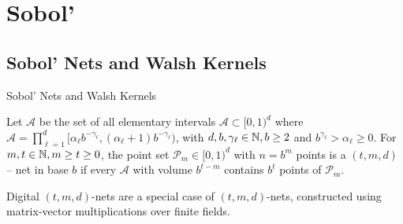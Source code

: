 \documentclass[handout, 10pt,compress,xcolor={usenames,dvipsnames}]{beamer} %
\begin{document}
\section{Sobol'}

\subsection{Sobol' Nets and Walsh Kernels}






\begin{frame}{Sobol' Nets and Walsh Kernels}
	\vspace{-1ex}
\begin{Definition}[$(t, m, d)$ -- net]
	\label{defn:tmd_net}
	Let $\mathcal{A}$ be the set of all elementary intervals $\mathcal{A} \subset [0, 1)^d$ where
	$\mathcal{A} = \prod_{\ell=1}^d [\alpha_\ell b^{-\gamma_\ell} , (\alpha_\ell + 1) b^{-\gamma_\ell})$, 
	with $d,b,\gamma_\ell \in \mathbb{N}, b \ge 2$ 
	and $b^{\gamma_\ell}
	> \alpha_\ell \ge 0$. For $m,t \in \mathbb{N}, m \ge t \ge 0$, the point set $\mathcal{P}_m \in [0, 1)^d$ with $n = b^m$ points is a $(t, m, d)$ -- net in base $b$ if every $\mathcal{A}$ with volume $b^{t-m}$ contains $b^t$ points of $\mathcal{P}_m$.
\end{Definition}	

Digital $(t,m, d)$-nets are a special case of $(t,m, d)$-nets, constructed using matrix-vector multiplications over finite fields. 

\end{frame}
\end{document}
